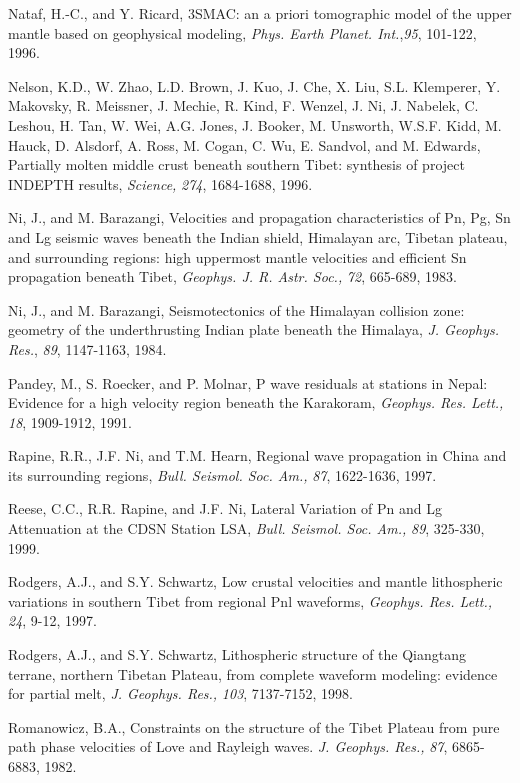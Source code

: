 \documentclass[12pt]{article}
\begin{document}
\begin{references}
Nataf, H.-C., and Y. Ricard, {3SMAC: an a priori tomographic
model of the upper mantle based on geophysical modeling}, {\it
Phys. Earth Planet. Int.},{\it 95}, {101-122}, 1996.

Nelson, K.D., W. Zhao, L.D. Brown, J. Kuo, J. Che, X. Liu, S.L. Klemperer,
Y. Makovsky, R. Meissner, J. Mechie, R. Kind, F. Wenzel, J. Ni, J. Nabelek,
C. Leshou, H. Tan, W. Wei, A.G. Jones, J. Booker, M. Unsworth, W.S.F. Kidd,
M. Hauck, D. Alsdorf, A. Ross, M. Cogan, C. Wu, E. Sandvol, and M. Edwards,
Partially molten middle crust beneath southern Tibet: synthesis of
project INDEPTH results, {\it Science,} {\it 274}, 1684-1688, 1996.

Ni, J., and M. Barazangi, Velocities and propagation characteristics
of Pn, Pg, Sn and Lg seismic waves beneath the Indian shield, Himalayan arc,
Tibetan plateau, and surrounding regions: high uppermost mantle velocities
and efficient Sn propagation beneath Tibet, {\it Geophys. J. R. Astr. Soc.,}
{\it 72}, 665-689, 1983.

Ni, J., and M. Barazangi, Seismotectonics of the Himalayan collision zone:
geometry of the underthrusting Indian plate beneath the Himalaya, {\it J. 
Geophys. Res.}, {\it 89}, 1147-1163, 1984.

Pandey, M., S. Roecker, and P. Molnar, P wave residuals at stations in
Nepal: Evidence for a high velocity region beneath the Karakoram, {\it Geophys.
Res. Lett.,} {\it 18}, 1909-1912, 1991.



Rapine, R.R., J.F. Ni, and T.M. Hearn, Regional wave propagation in China
and its surrounding regions, {\it Bull. Seismol. Soc. Am.,} {\it 87},
1622-1636, 1997.

Reese, C.C., R.R. Rapine, and J.F. Ni, Lateral Variation of Pn and Lg
Attenuation at the CDSN Station LSA, {\it Bull. Seismol. Soc. Am.,} {\it 89},
325-330, 1999.

Rodgers, A.J., and S.Y. Schwartz, Low crustal velocities and mantle
lithospheric variations in southern Tibet from regional Pnl waveforms,
{\it Geophys. Res. Lett.,} {\it 24}, 9-12, 1997.

Rodgers, A.J., and S.Y. Schwartz, Lithospheric structure of the
Qiangtang terrane, northern Tibetan Plateau, from complete waveform 
modeling: evidence for partial melt, {\it J. Geophys. Res.,} {\it 103}, 
7137-7152, 1998.

Romanowicz, B.A., Constraints on the structure of the Tibet Plateau
from pure path phase velocities of Love and Rayleigh waves. {\it J. Geophys.
Res.,} {\it 87}, 6865-6883, 1982.


\end{references}
\end{document}

